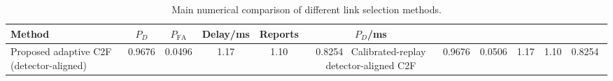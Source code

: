 \begin{table}[t]
    \centering
    \caption{Main numerical comparison of different link selection methods.}
    \label{tab:main_summary}
    \begin{tabular}{l c c c c c}
        \hline
        Method & $P_D$ & $P_{\mathrm{FA}}$ & Delay/ms & Reports & $P_D$/ms \\
        \hline
        Proposed adaptive C2F (detector-aligned) & 0.9676 & 0.0496 & 1.17 & 1.10 & 0.8254 \
        Calibrated-replay detector-aligned C2F & 0.9676 & 0.0506 & 1.17 & 1.10 & 0.8254 \
        \hline
    \end{tabular}
\end{table}
